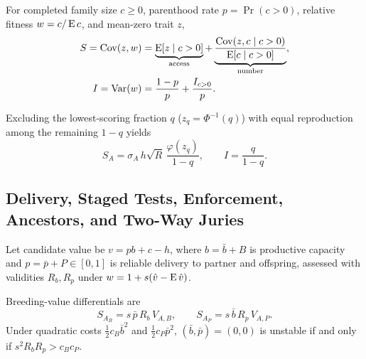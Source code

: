 \begin{proposition}\label{prop:episodes}
For completed family size $c\ge0$, parenthood rate $p=\Pr(c>0)$, relative fitness $w=c/\operatorname{E} c$, and mean-zero trait $z$,
\begin{equation}
\begin{aligned}
S=\operatorname{Cov}(z,w) &= \underbrace{\operatorname{E}[z\mid c>0]}_{\text{access}}+\underbrace{\frac{\operatorname{Cov}(z,c\mid c>0)}{\operatorname{E}[c\mid c>0]}}_{\text{number}},\\
I=\operatorname{Var}(w) &= \frac{1-p}{p}+\frac{I_{c>0}}{p}.
\end{aligned}\label{eq:episodes}
\end{equation}
\end{proposition}

\begin{corollary}\label{cor:floor}
Excluding the lowest-scoring fraction $q$ ($z_q=\Phi^{-1}(q)$) with equal reproduction among the remaining $1-q$ yields
\begin{equation}
S_A=\sigma_A\,h\sqrt{R}\,\frac{\varphi(z_q)}{1-q},\qquad I=\frac{q}{1-q}.\label{eq:floor}
\end{equation}
\end{corollary}

\subsection{Delivery, Staged Tests, Enforcement, Ancestors, and Two-Way Juries}
Let candidate value be $v=pb+c-h$, where $b=\bar b+B$ is productive capacity and $p=\bar p+P\in[0,1]$ is reliable delivery to partner and offspring, assessed with validities $R_b,R_p$ under $w=1+s(\hat v-\operatorname{E}\hat v)$.

\begin{proposition}\label{prop:delivery}
Breeding-value differentials are
\begin{equation}
S_{A_B}=s\,\bar p\,R_b\,V_{A,B},\qquad S_{A_P}=s\,\bar b\,R_p\,V_{A,P}.\label{eq:delivery}
\end{equation}
Under quadratic costs $\tfrac12c_B\bar b^2$ and $\tfrac12c_P\bar p^2$, $(\bar b,\bar p)=(0,0)$ is unstable if and only if $s^2R_bR_p>c_Bc_P$.
\end{proposition}

